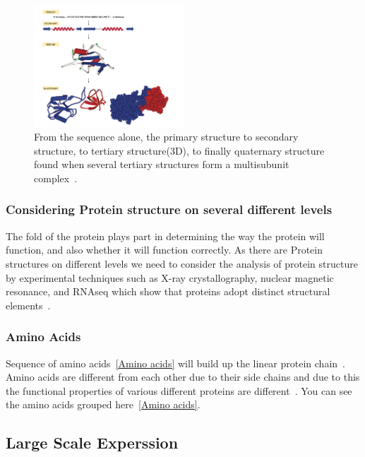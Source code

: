 \documentclass[]{final_report}
\begin{document}
\begin{figure}[h]
    \centering
    \includegraphics[width=0.5\textwidth]{Protein Structure.png}
    \caption{\label{fig:levels of protein structure.}From the sequence alone, the primary structure to secondary structure, to tertiary structure(3D), to finally quaternary structure found when several tertiary structures form a multisubunit complex~\cite{zvelebil_understanding_2008}.}
\end{figure}

\subsubsection{Considering Protein structure on several different levels}

The fold of the protein plays part in determining the way the protein will function, and also whether it will function correctly. As there are Protein structures on different levels we need to consider the analysis of protein structure by experimental techniques such as X-ray crystallography, nuclear magnetic resonance, and RNAseq which show that proteins adopt distinct structural elements~\cite{zvelebil_understanding_2008}.

\subsubsection{Amino Acids}

Sequence of amino acids~\ref{Amino acids} will build up the linear protein chain~\cite{zvelebil_understanding_2008}. Amino acids are different from each other due to their side chains and due to this the functional properties of various different proteins are different~\cite{zvelebil_understanding_2008}. You can see the amino acids grouped here~\ref{Amino acids}.

\subsection{Large Scale Experssion}
\end{document}
